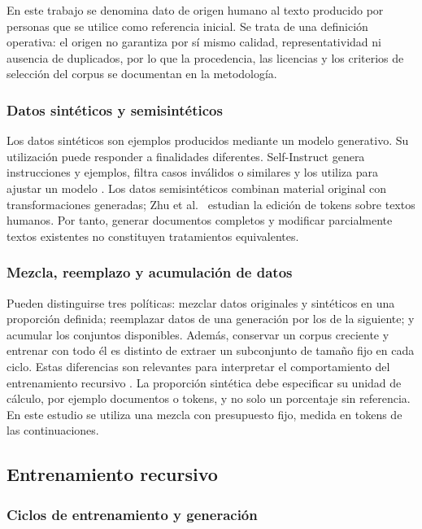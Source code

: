 \documentclass[12pt,letterpaper]{article}
\begin{document}
En este trabajo se denomina dato de origen humano al texto producido por
personas que se utilice como referencia inicial. Se trata de una definición
operativa: el origen no garantiza por sí mismo calidad, representatividad
ni ausencia de duplicados, por lo que la procedencia, las licencias y los
criterios de selección del corpus se documentan en la metodología.

\subsubsection{Datos sintéticos y semisintéticos}

Los datos sintéticos son ejemplos producidos mediante un modelo generativo.
Su utilización puede responder a finalidades diferentes. Self-Instruct
genera instrucciones y ejemplos, filtra casos inválidos o similares y los
utiliza para ajustar un modelo \cite{wang2023selfinstruct}. Los datos
semisintéticos combinan material original con transformaciones generadas;
Zhu et al.\ \cite{zhu2025} estudian la edición de tokens sobre textos humanos.
Por tanto, generar documentos completos y modificar parcialmente textos
existentes no constituyen tratamientos equivalentes.

\subsubsection{Mezcla, reemplazo y acumulación de datos}

Pueden distinguirse tres políticas: mezclar datos originales y sintéticos en
una proporción definida; reemplazar datos de una generación por los de la
siguiente; y acumular los conjuntos disponibles. Además, conservar un corpus
creciente y entrenar con todo él es distinto de extraer un subconjunto de
tamaño fijo en cada ciclo. Estas diferencias son relevantes para interpretar
el comportamiento del entrenamiento recursivo \cite{kazdan2025}. La
proporción sintética debe especificar su unidad de cálculo, por ejemplo
documentos o tokens, y no solo un porcentaje sin referencia. En este
estudio se utiliza una mezcla con presupuesto fijo, medida en tokens de las
continuaciones.

\subsection{Entrenamiento recursivo}

\subsubsection{Ciclos de entrenamiento y generación}
\end{document}
